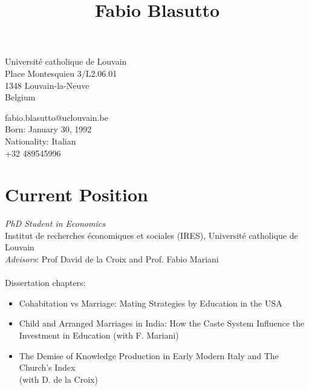 \documentclass[10pt]{article} %
\begin{document}
\begin{center}
\title{Fabio Blasutto} %
\end{center}

\pagestyle{empty}
\parbox{0.5\textwidth}{ %
 Université catholique de Louvain\\ %
 Place Montesquieu 3/L2.06.01\\ %
 1348 Louvain-la-Neuve\\ %
 Belgium %
}
\hfill %
\parbox[left]{0.5\textwidth}{\raggedleft 

fabio.blasutto@uclouvain.be \\ %
Born: January 30, 1992 \\
Nationality: Italian \\
+32 489545996  
}
\vspace{0.4cm}
\section{Current Position}
\textit{PhD Student in Economics}\\
Institut de recherches économiques et sociales (IRES), Université catholique de Louvain \\
\textit{Advisors}: Prof David de la Croix and Prof. Fabio Mariani\\
\vspace{0.2cm}\\
Dissertation chapters: 
\begin{itemize}
\item Cohabitation vs Marriage: Mating Strategies by Education in the USA
\item Child and Arranged Marriages in India: How the Caste System Influence the Investment in Education
(with F. Mariani)
\item The Demise of Knowledge Production in Early Modern Italy and The Church's Index\\
(with D. de la Croix)
\end{itemize}
\end{document}
